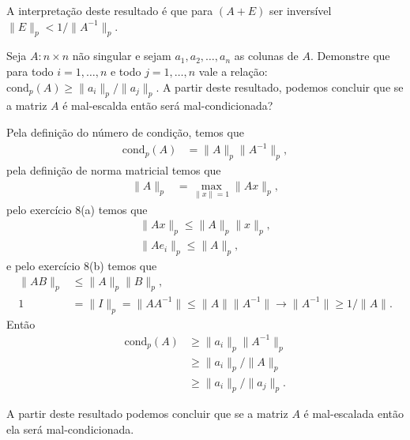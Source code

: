 \begin{questions}
\begin{solution}
        A interpreta\c{c}\~{a}o deste resultado \'{e} que para $\left( A + E \right)$ ser invers\'{i}vel $\| E \|_p < 1 / \| A^{-1} \|_p$.
    \end{solution}

    \question Seja $A : n \times n$ n\~{a}o singular e sejam $a_1, a_2, \ldots, a_n$ as colunas de $A$. Demonstre que para todo $i = 1, \ldots, n$ e todo $j = 1, \ldots, n$ vale a rela\c{c}\~{a}o: $\text{cond}_p (A) \geq \| a_i \|_p / \| a_j \|_p$. A partir deste resultado, podemos concluir que se a matriz $A$ \'{e} mal-escalda ent\~{a}o ser\'{a} mal-condicionada?
    \begin{solution}
        Pela defini\c{c}\~{a}o do n\'{u}mero de condi\c{c}\~{a}o, temos que
        \begin{align*}
            \text{cond}_p \left( A \right) &= \| A \|_p \| A^{-1} \|_p,
        \end{align*}
        pela defini\c{c}\~{a}o de norma matricial temos que
        \begin{align*}
            \| A \|_p &= \max_{\| x \| = 1} \| A x \|_p,
        \end{align*}
        pelo exerc\'{i}cio 8(a) temos que
        \begin{align*}
            \| A x \|_p \leq \| A \|_p \| x \|_p, \\
            \| A e_i \|_p \leq \| A \|_p,
        \end{align*}
        e pelo exerc\'{i}cio 8(b) temos que
        \begin{align*}
            \| A B \|_p &\leq \| A \|_p \| B \|_p, \\
            1 &= \| I \|_p = \| A A^{-1} \| \leq \| A \| \| A^{-1} \| \rightarrow \| A^{-1} \| \geq 1 / \| A \|.
        \end{align*}
        Ent\~{a}o
        \begin{align*}
            \text{cond}_p \left( A \right) &\geq \| a_i \|_p \| A^{-1} \|_p \\
            &\geq \| a_i \|_p / \| A \|_p \\
            &\geq \| a_i \|_p / \| a_j \|_p.
        \end{align*}

        A partir deste resultado podemos concluir que se a matriz $A$ \'{e} mal-escalada ent\~{a}o ela ser\'{a} mal-condicionada.
    \end{solution}
\end{questions}
